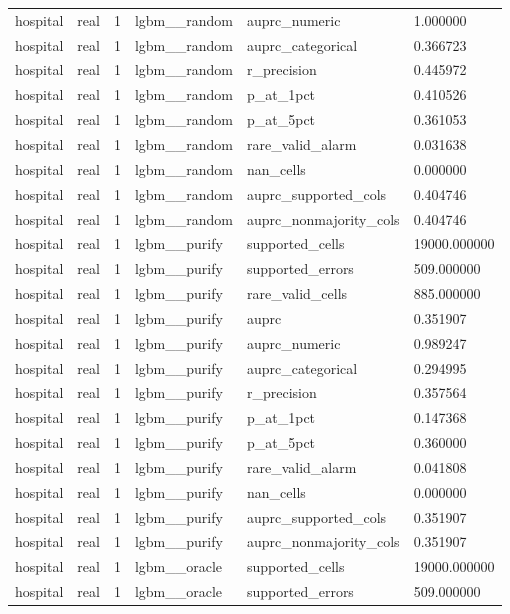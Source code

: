 \begin{tabular}{llllll}
hospital & real & 1 & lgbm\_\_random & auprc\_numeric & 1.000000 \\
hospital & real & 1 & lgbm\_\_random & auprc\_categorical & 0.366723 \\
hospital & real & 1 & lgbm\_\_random & r\_precision & 0.445972 \\
hospital & real & 1 & lgbm\_\_random & p\_at\_1pct & 0.410526 \\
hospital & real & 1 & lgbm\_\_random & p\_at\_5pct & 0.361053 \\
hospital & real & 1 & lgbm\_\_random & rare\_valid\_alarm & 0.031638 \\
hospital & real & 1 & lgbm\_\_random & nan\_cells & 0.000000 \\
hospital & real & 1 & lgbm\_\_random & auprc\_supported\_cols & 0.404746 \\
hospital & real & 1 & lgbm\_\_random & auprc\_nonmajority\_cols & 0.404746 \\
hospital & real & 1 & lgbm\_\_purify & supported\_cells & 19000.000000 \\
hospital & real & 1 & lgbm\_\_purify & supported\_errors & 509.000000 \\
hospital & real & 1 & lgbm\_\_purify & rare\_valid\_cells & 885.000000 \\
hospital & real & 1 & lgbm\_\_purify & auprc & 0.351907 \\
hospital & real & 1 & lgbm\_\_purify & auprc\_numeric & 0.989247 \\
hospital & real & 1 & lgbm\_\_purify & auprc\_categorical & 0.294995 \\
hospital & real & 1 & lgbm\_\_purify & r\_precision & 0.357564 \\
hospital & real & 1 & lgbm\_\_purify & p\_at\_1pct & 0.147368 \\
hospital & real & 1 & lgbm\_\_purify & p\_at\_5pct & 0.360000 \\
hospital & real & 1 & lgbm\_\_purify & rare\_valid\_alarm & 0.041808 \\
hospital & real & 1 & lgbm\_\_purify & nan\_cells & 0.000000 \\
hospital & real & 1 & lgbm\_\_purify & auprc\_supported\_cols & 0.351907 \\
hospital & real & 1 & lgbm\_\_purify & auprc\_nonmajority\_cols & 0.351907 \\
hospital & real & 1 & lgbm\_\_oracle & supported\_cells & 19000.000000 \\
hospital & real & 1 & lgbm\_\_oracle & supported\_errors & 509.000000 \\

\end{tabular}
